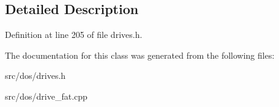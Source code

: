 \subsection{Detailed Description}


Definition at line 205 of file drives.\-h.



The documentation for this class was generated from the following files\-:\begin{DoxyCompactItemize}
\item 
src/dos/drives.\-h\item 
src/dos/drive\-\_\-fat.\-cpp\end{DoxyCompactItemize}
